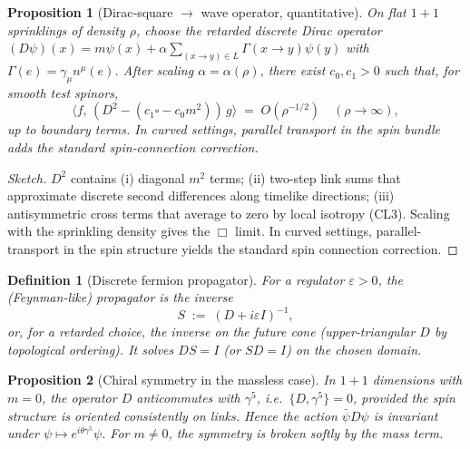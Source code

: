 \documentclass[12pt,a4paper]{article}
\newtheorem{definition}{Definition}
\newtheorem{proposition}{Proposition}
\begin{document}

\begin{proposition}[Dirac‑square \texorpdfstring{$\to$}{->} wave operator, quantitative]\label{prop:D2}
On flat \(1{+}1\) sprinklings of density \(\rho\), choose the retarded discrete Dirac operator
\( (D\psi)(x)=m\psi(x)+\alpha\sum_{(x\to y)\in L}\Gamma(x\to y)\psi(y)\) with \(\Gamma(e)=\gamma_\mu n^\mu(e)\).
After scaling \(\alpha=\alpha(\rho)\), there exist \(c_0,c_1>0\) such that, for smooth test spinors,
\[
\big\langle f,\,(D^2-(c_1\square-c_0 m^2))\,g\big\rangle \;=\; O(\rho^{-1/2})\quad(\rho\to\infty),
\]
up to boundary terms. In curved settings, parallel transport in the spin bundle adds the standard
spin‑connection correction.
\end{proposition}
  

\begin{proof}[Sketch]
$D^2$ contains (i) diagonal $m^2$ terms; (ii) two-step link sums that approximate discrete second differences along timelike directions;
(iii) antisymmetric cross terms that average to zero by local isotropy (CL3). Scaling with the sprinkling density gives the $\Box$ limit.
In curved settings, parallel-transport in the spin structure yields the standard spin connection correction.
\end{proof}

\begin{definition}[Discrete fermion propagator]\label{def:propagator}
For a regulator $\varepsilon>0$, the (Feynman-like) propagator is the inverse
\begin{equation}
  S\;:=\; (D + i\varepsilon I)^{-1},
\end{equation}
or, for a retarded choice, the inverse on the future cone (upper-triangular $D$ by topological ordering).
It solves $D S=I$ (or $S D=I$) on the chosen domain.
\end{definition}

\begin{proposition}[Chiral symmetry in the massless case]\label{prop:chiral}
In $1{+}1$ dimensions with $m=0$, the operator $D$ \emph{anticommutes} with $\gamma^5$,
i.e.\ $\{D,\gamma^5\}=0$, provided the spin structure is oriented consistently on links.
Hence the action $\bar\psi D\psi$ is invariant under $\psi\mapsto e^{i\theta\gamma^5}\psi$.
For $m\neq 0$, the symmetry is broken softly by the mass term.
\end{proposition}
\end{document}
